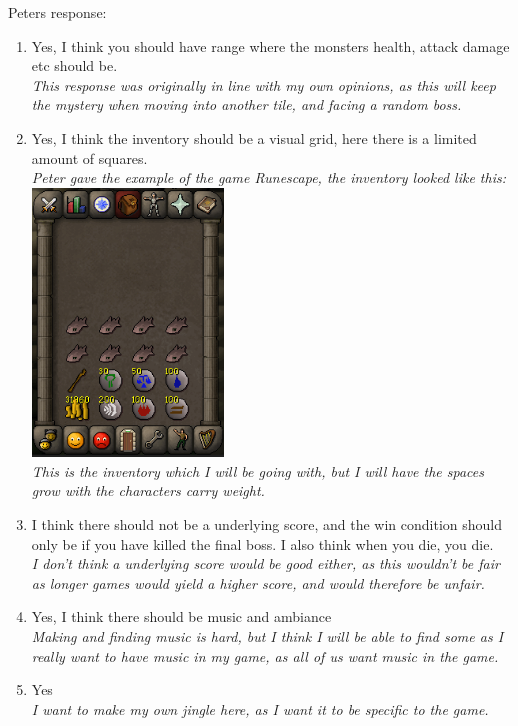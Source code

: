 \documentclass[12pt]{article}
\begin{document}
\centerline{Peters response:}

\begin{enumerate}
	\item{Yes, I think you should have range where the monsters health, attack damage etc should be. \\}
	\em{This response was originally in line with my own opinions, as this will keep the mystery when moving into another tile, and facing a random boss.}

	\item{Yes, I think the inventory should be a visual grid, here there is a limited amount of squares. \\}
	\em{Peter gave the example of the game Runescape, the inventory looked like this:\\}
	\includegraphics[width = 0.4\textwidth]{RuneScape_Image}
	\\
	\em{This is the inventory which I will be going with, but I will have the spaces grow with the characters carry weight.}

	\item{I think there should not be a underlying score, and the win condition should only be if you have killed the final boss. I also think when you die, you die.\\}
	\em{I don't think a underlying score would be good either, as this wouldn't be fair as longer games would yield a higher score, and would therefore be unfair.}

	\item{Yes, I think there should be music and ambiance\\}
	\em{Making and finding music is hard, but I think I will be able to find some as I really want to have music in my game, as all of us want music in the game.}

	\item{Yes\\}
	\em{I want to make my own jingle here, as I want it to be specific to the game.}


\end{enumerate}
\end{document}
